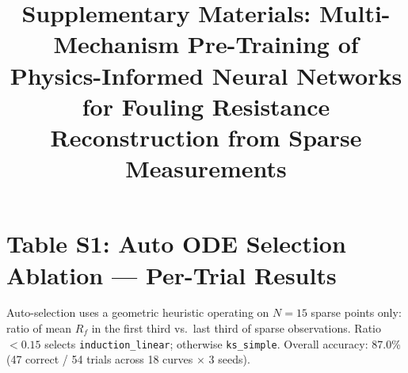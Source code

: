 \documentclass{article}
\begin{document}
\title{Supplementary Materials: Multi-Mechanism Pre-Training of Physics-Informed Neural Networks for Fouling Resistance Reconstruction from Sparse Measurements}

\maketitle

\section*{Table S1: Auto ODE Selection Ablation --- Per-Trial Results}

Auto-selection uses a geometric heuristic operating on $N=15$ sparse points only:
ratio of mean $R_f$ in the first third vs.\ last third of sparse observations.
Ratio $<0.15$ selects \texttt{induction\_linear}; otherwise \texttt{ks\_simple}.
Overall accuracy: 87.0\% (47 correct / 54 trials across 18 curves $\times$ 3 seeds).
\end{document}
